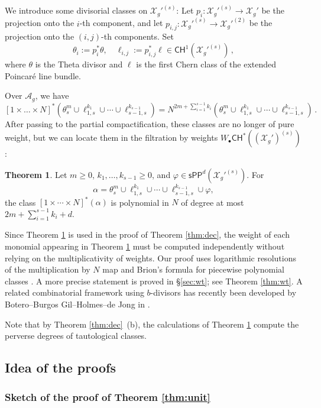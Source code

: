 \documentclass[11pt]{article}
\def\CH{\mathsf{CH}}
\def\X{\mathcal{X}}
\newcommand{\sPP}{\mathsf{sPP}}
\newcommand{\spp}{\sPP}
\theoremstyle{definition}
\newtheorem{theoremintro}{Theorem}
\begin{document}
We introduce some divisorial classes on $\X_g'^{(s)}$: Let $p_i : \X_g'^{(s)} \to \X_g'$ be the projection onto the $i$-th component, and let
$p_{i,j} : \X_g'^{(s)} \to \X_g'^{(2)}$ be the projection onto the $(i,j)$-th
components. Set
\[
\theta_i := p_i^*\theta,\quad
\ell_{i,j} := p_{i,j}^*\ell
\in \CH^1(\X_g'^{(s)})\,,
\]
where $\theta$ is the Theta divisor and $\ell$ is the first Chern class of the
extended Poincar\'e line bundle.

Over $\mathcal A_g$, we have
$$
[1\times \ldots \times N]^*(\theta_s^m
    \cup \ell_{1,s}^{k_1}
    \cup \cdots
    \cup \ell_{s-1,s}^{k_{s-1}}) = N^{2m+\sum_{i=1}^{s-1}k_i} ( \theta_s^m
    \cup \ell_{1,s}^{k_1}
    \cup \cdots
    \cup \ell_{s-1,s}^{k_{s-1}})\,.
$$
After passing to the partial compactification, these classes are no longer of pure weight, but we can locate them in the filtration by weights $W_\bullet\CH^*((\X_g')^{(s)})$:

\begin{theoremintro}\label{thm:weight_main}
    Let $m \geq 0$, $k_1,\ldots,k_{s-1} \geq 0$, and
    $\varphi \in \spp^{d}(\X_g'^{(s)})$. For
    \[
    \alpha
    =
    \theta_s^m
    \cup \ell_{1,s}^{k_1}
    \cup \cdots
    \cup \ell_{s-1,s}^{k_{s-1}}
    \cup \varphi,
    \]
    the class $[1 \times \cdots \times N]^*(\alpha)$ is polynomial in $N$ of
    degree at most $2m+\sum_{i=1}^{s-1} k_i+d$.
\end{theoremintro}

Since Theorem \ref{thm:weight_main} is used in the proof of Theorem \ref{thm:dec}, the weight of each monomial appearing in Theorem \ref{thm:weight_main} must be computed independently without relying on the multiplicativity of weights.
Our proof uses logarithmic resolutions of the multiplication by $N$ map and Brion's formula for piecewise polynomial classes \cite{Brion}.
A more precise statement is proved in \S\ref{sec:wt}; see Theorem \ref{thm:wt}. A related combinatorial framework using $b$-divisors has recently been developed by Botero--Burgos Gil--Holmes--de Jong in \cite{BGHdJ}.

Note that by Theorem \ref{thm:dec}~(b), the calculations of Theorem \ref{thm:weight_main} compute the perverse degrees of tautological classes.

\subsection{Idea of the proofs}

\subsubsection{Sketch of the proof of Theorem \ref{thm:unit}}
\end{document}

